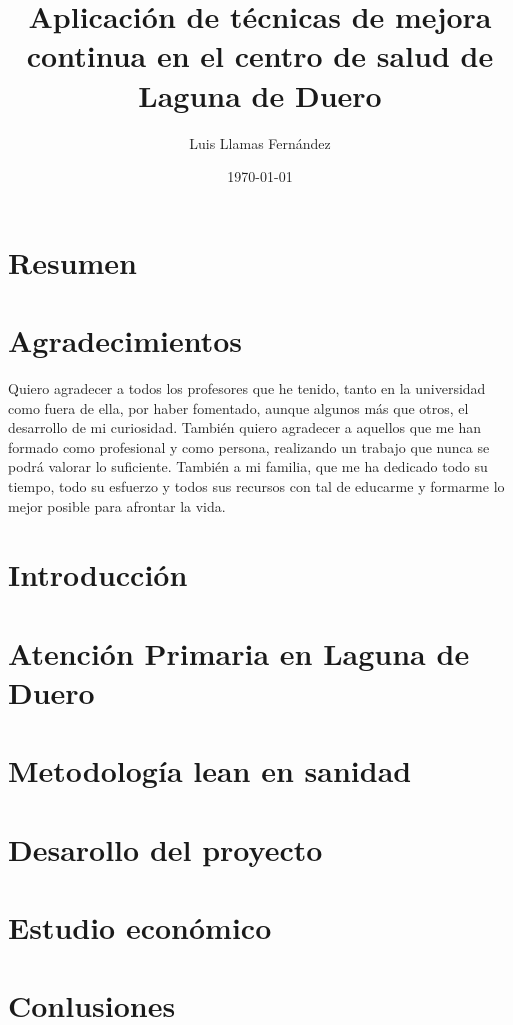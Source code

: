 \documentclass[12pt, a4paper]{report}
\begin{document}
\title{Aplicación de técnicas de mejora continua en el centro de salud de Laguna de Duero}
\author{Luis Llamas Fernández}
\date{\today}
\maketitle

\chapter*{Resumen}
\chapter*{Agradecimientos}

Quiero agradecer a todos los profesores que he tenido, tanto en la universidad como fuera de ella, por haber fomentado, aunque algunos más que otros, el desarrollo de mi curiosidad. También quiero agradecer a aquellos que me han formado como profesional y como persona, realizando un trabajo que nunca se podrá valorar lo suficiente. También a mi familia, que me ha dedicado todo su tiempo, todo su esfuerzo y todos sus recursos con tal de educarme y formarme lo mejor posible para afrontar la vida.

\tableofcontents

\chapter{Introducción}


\chapter{Atención Primaria en Laguna de Duero}


\chapter{Metodología lean en sanidad}


\chapter{Desarollo del proyecto}

\chapter{Estudio económico}

\chapter{Conlusiones}


\end{document}
